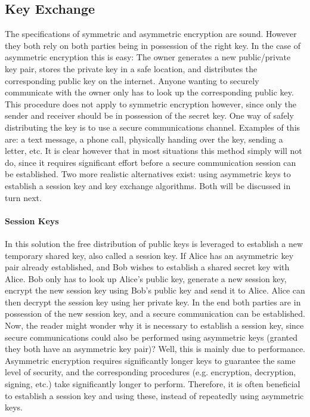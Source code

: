 \documentclass[11pt]{article}
\begin{document}
\subsection{Key Exchange} The specifications of symmetric and asymmetric encryption are sound. However they both rely on both parties being in possession of the right key. In the case of asymmetric encryption this is easy: The owner generates a new public/private key pair, stores the private key in a safe location, and distributes the corresponding public key on the internet. Anyone wanting to securely communicate with the owner only has to look up the corresponding public key. This procedure does not apply to symmetric encryption however, since only the sender and receiver should be in possession of the secret key. One way of safely distributing the key is to use a secure communications channel. Examples of this are: a text message, a phone call, physically handing over the key, sending a letter, etc. It is clear however that in most situations this method simply will not do, since it requires significant effort before a secure communication session can be established. Two more realistic alternatives exist: using asymmetric keys to establish a session key and key exchange algorithms. Both will be discussed in turn next.

\paragraph{Session Keys} In this solution the free distribution of public keys is leveraged to establish a new temporary shared key, also called a session key. If Alice has an asymmetric key pair already established, and Bob wishes to establish a shared secret key with Alice. Bob only has to look up Alice's public key, generate a new session key, encrypt the new session key using Bob's public key and send it to Alice. Alice can then decrypt the session key using her private key. In the end both parties are in possession of the new session key, and a secure communication can be established. Now, the reader might wonder why it is necessary to establish a session key, since secure communications could also be performed using asymmetric keys (granted they both have an asymmetric key pair)? Well, this is mainly due to performance. Asymmetric encryption requires significantly longer keys to guarantee the same level of security, and the corresponding procedures (e.g. encryption, decryption, signing, etc.) take significantly longer to perform. Therefore, it is often beneficial to establish a session key and using these, instead of repeatedly using asymmetric keys.
\end{document}

